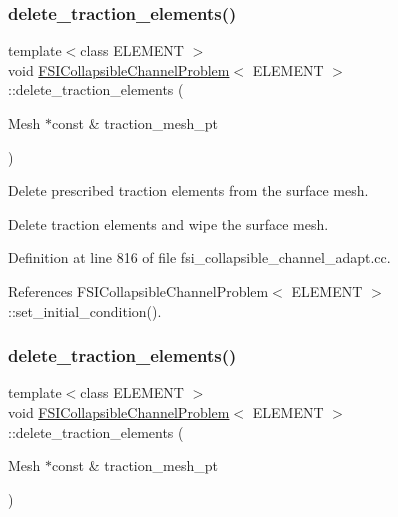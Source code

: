 \subsubsection{\texorpdfstring{delete\+\_\+traction\+\_\+elements()}{delete\_traction\_elements()}\hspace{0.1cm}{\footnotesize\ttfamily [1/3]}}
{\footnotesize\ttfamily template$<$class E\+L\+E\+M\+E\+NT $>$ \\
void \hyperlink{classFSICollapsibleChannelProblem}{F\+S\+I\+Collapsible\+Channel\+Problem}$<$ E\+L\+E\+M\+E\+NT $>$\+::delete\+\_\+traction\+\_\+elements (\begin{DoxyParamCaption}\item[{Mesh $\ast$const \&}]{traction\+\_\+mesh\+\_\+pt }\end{DoxyParamCaption})\hspace{0.3cm}{\ttfamily [private]}}



Delete prescribed traction elements from the surface mesh. 

Delete traction elements and wipe the surface mesh. 

Definition at line 816 of file fsi\+\_\+collapsible\+\_\+channel\+\_\+adapt.\+cc.



References F\+S\+I\+Collapsible\+Channel\+Problem$<$ E\+L\+E\+M\+E\+N\+T $>$\+::set\+\_\+initial\+\_\+condition().

\mbox{\label{classFSICollapsibleChannelProblem_af1848415423aa824b91357922905a18f}} 
\subsubsection{\texorpdfstring{delete\+\_\+traction\+\_\+elements()}{delete\_traction\_elements()}\hspace{0.1cm}{\footnotesize\ttfamily [2/3]}}
{\footnotesize\ttfamily template$<$class E\+L\+E\+M\+E\+NT $>$ \\
void \hyperlink{classFSICollapsibleChannelProblem}{F\+S\+I\+Collapsible\+Channel\+Problem}$<$ E\+L\+E\+M\+E\+NT $>$\+::delete\+\_\+traction\+\_\+elements (\begin{DoxyParamCaption}\item[{Mesh $\ast$const \&}]{traction\+\_\+mesh\+\_\+pt }\end{DoxyParamCaption})\hspace{0.3cm}{\ttfamily [private]}}




